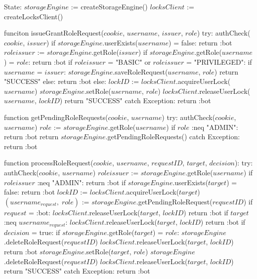 State:
    $storageEngine$ := createStorageEngine()
    $locksClient$ := createLocksClient()

funciton issueGrantRoleRequest($cookie$, $username$, $issuer$, $role$) 
    try:
        authCheck($cookie$, $issuer$)
        if $storageEngine$.userExists($username$) = false:
            return :bot
        $role{issuer}$ := $storageEngine$.getRole($issuer$)
        if $storageEngine$.getRole($username$) = $role$:
            return :bot
        if $role{issuer}$ = "BASIC" or $role{issuer}$ = "PRIVILEGED":
            if $username$ = $issuer$:
                $storageEngine$.saveRoleRequest($username$, $role$)
                return "SUCCESS"
            else:
                return :bot
        else:
            $lockID$ := $locksClient$.acquireUserLock($username$)
            $storageEngine$.setRole($username$, $role$)
            $locksClient$.releaseUserLock($username$, $lockID$)
            return "SUCCESS"
    catch Exception: 
        return :bot

function getPendingRoleRequests($cookie$, $username$) 
    try:
        authCheck($cookie$, $username$)
        $role$ := $storageEngine$.getRole($username$)
        if $role$ :neq "ADMIN":
            return :bot
        return $storageEngine$.getPendingRoleRequests()
    catch Exception: 
        return :bot

function processRoleRequest($cookie$, $username$, $requestID$, $target$, $decision$): 
    try:
        authCheck($cookie$, $username$)
        $role{issuer}$ := $storageEngine$.getRole($username$)
        if $role{issuer}$ :neq "ADMIN":
            return :bot
        if $storageEngine$.userExists($target$) = false:
            return :bot
        $lockID$ := $locksClient$.acquireUserLock($target$)
        $(username_{request}, \; role)$ := $storageEngine$.getPendingRoleRequest($requestID$)
        if $request$ = :bot: 
            $locksClient$.releaseUserLock($target$, $lockID$)
            return :bot
        if $target$ :neq $username_{request}$:
            $locksClient$.releaseUserLock($target$, $lockID$)
            return :bot
        if $decision$ = true:
            if $storageEngine$.getRole($target$) = $role$:
                $storageEngine$.deleteRoleRequest($requestID$)
                $locksClient$.releaseUserLock($target$, $lockID$)
                return :bot
            $storageEngine$.setRole($target$, $role$)
        $storageEngine$.deleteRoleRequest($requestID$)
        $locksClient$.releaseUserLock($target$, $lockID$)
        return "SUCCESS"
    catch Exception: 
        return :bot